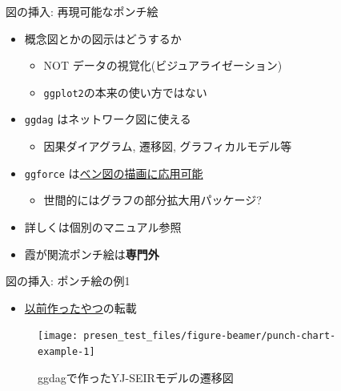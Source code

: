 \documentclass[
  12pt,
  ignorenonframetext,
]{beamer}
\providecommand{\tightlist}{%
  \setlength{\itemsep}{0pt}\setlength{\parskip}{0pt}}
\begin{document}
\begin{frame}[fragile]{図の挿入: 再現可能なポンチ絵}
\protect\hypertarget{ux56f3ux306eux633fux5165-ux518dux73feux53efux80fdux306aux30ddux30f3ux30c1ux7d75}{}

\begin{itemize}
\tightlist
\item
  概念図とかの図示はどうするか

  \begin{itemize}
  \tightlist
  \item
    NOT データの視覚化(ビジュアライゼーション)
  \item
    \texttt{ggplot2}の本来の使い方ではない
  \end{itemize}
\item
  \texttt{ggdag} はネットワーク図に使える

  \begin{itemize}
  \tightlist
  \item
    因果ダイアグラム, 遷移図, グラフィカルモデル等
  \end{itemize}
\item
  \texttt{ggforce}
  は\href{https://rpubs.com/sdutky/559050}{ベン図の描画に応用可能}

  \begin{itemize}
  \tightlist
  \item
    世間的にはグラフの部分拡大用パッケージ?
  \end{itemize}
\item
  詳しくは個別のマニュアル参照
\item
  霞が関流ポンチ絵は\textbf{専門外}
\end{itemize}

\end{frame}

\begin{frame}{図の挿入: ポンチ絵の例1}
\protect\hypertarget{ux56f3ux306eux633fux5165-ux30ddux30f3ux30c1ux7d75ux306eux4f8b1}{}

\begin{itemize}
\tightlist
\item
  \href{https://speakerdeck.com/ktgrstsh/r-and-epidemical-mathematical-models}{以前作ったやつ}の転載
\end{itemize}

\begin{figure}

{\centering \texttt{[image: presen\_test\_files/figure-beamer/punch-chart-example-1]} 

}

\caption{ggdagで作ったYJ-SEIRモデルの遷移図}\label{fig:punch-chart-example}
\end{figure}

\end{frame}
\end{document}
